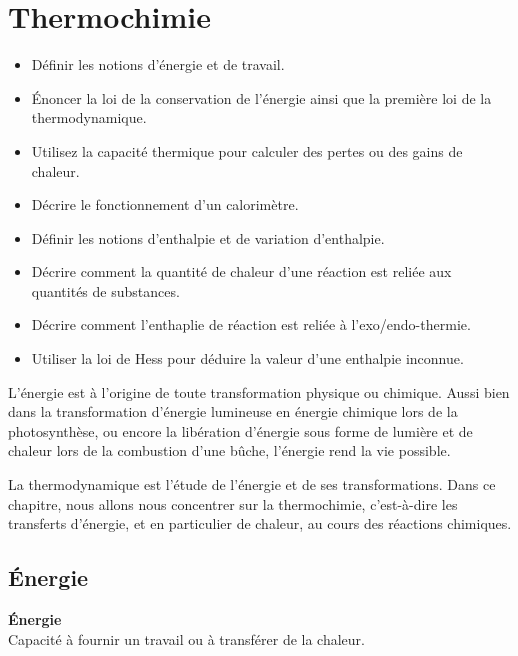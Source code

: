 \documentclass[
  11pt,
  a4paper,
  openany]{book}
\providecommand{\tightlist}{%
  \setlength{\itemsep}{0pt}\setlength{\parskip}{0pt}}
\begin{document}
\hypertarget{thermochimie}{%
\chapter{Thermochimie}\label{thermochimie}}

\begin{objectives}

\begin{itemize}
\tightlist
\item
  Définir les notions d'énergie et de travail.
\item
  Énoncer la loi de la conservation de l'énergie ainsi que la première loi de la thermodynamique.
\item
  Utilisez la capacité thermique pour calculer des pertes ou des gains de chaleur.
\item
  Décrire le fonctionnement d'un calorimètre.
\item
  Définir les notions d'enthalpie et de variation d'enthalpie.
\item
  Décrire comment la quantité de chaleur d'une réaction est reliée aux quantités de substances.
\item
  Décrire comment l'enthaplie de réaction est reliée à l'exo/endo-thermie.
\item
  Utiliser la loi de Hess pour déduire la valeur d'une enthalpie inconnue.
\end{itemize}

\end{objectives}

L'énergie est à l'origine de toute transformation physique ou chimique. Aussi bien dans la transformation d'énergie lumineuse en énergie chimique lors de la photosynthèse, ou encore la libération d'énergie sous forme de lumière et de chaleur lors de la combustion d'une bûche, l'énergie rend la vie possible.

La thermodynamique est l'étude de l'énergie et de ses transformations. Dans ce chapitre, nous allons nous concentrer sur la thermochimie, c'est-à-dire les transferts d'énergie, et en particulier de chaleur, au cours des réactions chimiques.

\hypertarget{uxe9nergie}{%
\section{Énergie}\label{uxe9nergie}}

\begin{tcolorbox}
\textbf{Énergie}\\
Capacité à fournir un travail ou à transférer de la chaleur.

\end{tcolorbox}
\end{document}
